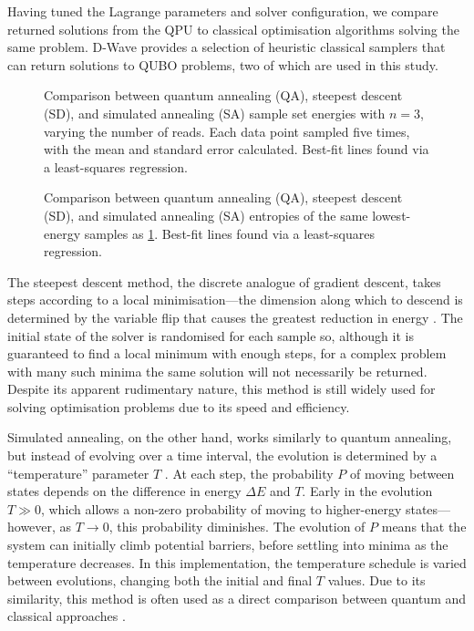 \documentclass[twocolumn]{article}
\theoremstyle{definition}
\begin{document}
Having tuned the Lagrange parameters and solver configuration, we compare returned solutions from the QPU to classical optimisation algorithms solving the same problem. D-Wave provides a selection of heuristic classical samplers that can return solutions to QUBO problems, two of which are used in this study.

\begin{figure}[p]
    \centering\footnotesize
    
    \caption{Comparison between quantum annealing (QA), steepest descent (SD), and simulated annealing (SA) sample set energies with $n=3$, varying the number of reads. Each data point sampled five times, with the mean and standard error calculated. Best-fit lines found via a least-squares regression.}
    \label{fig:reads}
\end{figure}

\begin{figure}[p]
    \centering\footnotesize
    
    \caption{Comparison between quantum annealing (QA), steepest descent (SD), and simulated annealing (SA) entropies of the same lowest-energy samples as \cref{fig:reads}. Best-fit lines found via a least-squares regression.}
    \label{fig:entropy}
\end{figure}

The steepest descent method, the discrete analogue of gradient descent, takes steps according to a local minimisation---the dimension along which to descend is determined by the variable flip that causes the greatest reduction in energy \cite{dwave_samplers}. The initial state of the solver is randomised for each sample so, although it is guaranteed to find a local minimum with enough steps, for a complex problem with many such minima the same solution will not necessarily be returned. Despite its apparent rudimentary nature, this method is still widely used for solving optimisation problems due to its speed and efficiency.

Simulated annealing, on the other hand, works similarly to quantum annealing, but instead of evolving over a time interval, the evolution is determined by a ``temperature'' parameter $T$ \cite{kirkpatrick_optimization_1983}. At each step, the probability $P$ of moving between states depends on the difference in energy $\Delta E$ and $T$. Early in the evolution $T\gg0$, which allows a non-zero probability of moving to higher-energy states---however, as $T\to 0$, this probability diminishes. The evolution of $P$ means that the system can initially climb potential barriers, before settling into minima as the temperature decreases. In this implementation, the temperature schedule is varied between evolutions, changing both the initial and final $T$ values. Due to its similarity, this method is often used as a direct comparison between quantum and classical approaches \cite{albash_demonstration_2018}.
\end{document}
